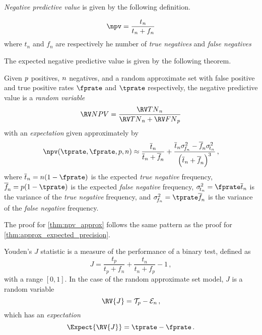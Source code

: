 \documentclass[ ../main.tex]{subfiles}
\begin{document}
\emph{Negative predictive value} is given by the following definition.
\begin{definition}
	\begin{equation}
	\npv = \frac{t_n}{t_n + f_n}
	\end{equation}
	where $t_n$ and $f_n$ are respectively he number of \emph{true negatives} 
	and \emph{false negatives} 
\end{definition}
The expected negative predictive value is given by the following theorem.
\begin{theorem}
	\label{thm:npv_approx}
	Given $p$ positives, $n$ negatives, and a random approximate set with false positive and true positive rates $\fprate$ and $\tprate$ respectively, the negative predictive value is a \emph{random variable}
	\begin{equation}
		\NPV = \frac{\TN_{\n}}{\TN_{\n} + \FN_{\p}}
	\end{equation}
	with an \emph{expectation} given approximately by
	\begin{equation}
	\label{eq:npv_approx}
	\npv(\tprate, \fprate , \p, \n) \approx 
	\frac{\overline{t}_n}{\overline{t}_n + \overline{f}_{\!n}} +
	\frac{\overline{t}_n \sigma_{\!f_n}^2 - \overline{f}_{\!n} 
	\sigma_{\!t_n}^2}{\left(\overline{t}_n + \overline{f}_{\!n}\right)^3}\,,
	\end{equation}
	where $\overline{t}_\n = \n(1-\fprate)$ is the expected \emph{true negative} frequency, $\overline{f}_{\!\n} =  \p(1-\tprate)$ is the expected \emph{false negative} frequency, $\sigma_{\!t_\n}^2 = \fprate \overline{t}_\n$ is the variance of the \emph{true negative} frequency, and $\sigma_{\!f_\n}^2 = \tprate\overline{f}_{\!\n}$ is the variance of the \emph{false negative} frequency.
\end{theorem}
The proof for \cref{thm:npv_approx} follows the same pattern as the proof for \cref{thm:approx_expected_precision}.

Youden's $J$ statistic is a measure of the performance of a binary test, defined as
\begin{equation}
    J = \frac{t_p}{t_p + f_n} + \frac{t_n}{t_n + f_p} - 1\,,
\end{equation}
with a range $[0,1]$.
In the case of the random approximate set model, $J$ is a random variable
\begin{equation}
	\RV{J} = \TPR_\p - \FPR_\n\,,
\end{equation}
which has an \emph{expectation}
\begin{equation}
	\Expect{\RV{J}} = \tprate - \fprate\,.
\end{equation}
\end{document}
